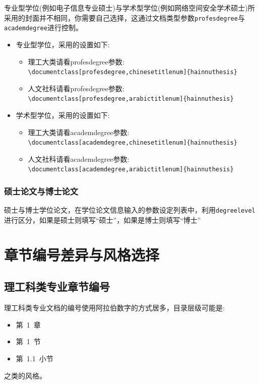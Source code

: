 专业型学位(例如电子信息专业硕士)与学术型学位(例如网络空间安全学术硕士)所采用的封面并不相同，你需要自己选择，这通过文档类型参数\verb|profesdegree|与\verb|academdegree|进行控制。
\begin{itemize}
\item 专业型学位，采用的设置如下:
	\begin{itemize}
	\item 理工大类请看profesdegree参数:\\
	  \verb|\documentclass[profesdegree,chinesetitlenum]{hainnuthesis}|
	\item 人文社科请看profesdegree参数:\\
	 \verb|\documentclass[profesdegree,arabictitlenum]{hainnuthesis}|
	\end{itemize} 
\item 学术型学位，采用的设置如下:
	\begin{itemize}
	\item 理工大类请看academdegree参数:\\
	 \verb|\documentclass[academdegree,chinesetitlenum]{hainnuthesis}|
	\item 人文社科请看academdegree参数:\\
	 \verb|\documentclass[academdegree,arabictitlenum]{hainnuthesis}|
	\end{itemize} 
\end{itemize}

\subsubsection{硕士论文与博士论文}
硕士与博士学位论文，在学位论文信息输入的参数设定列表中，利用\verb|degreelevel|
进行区分，如果是硕士则填写“硕士”，如果是博士则填写“博士” 


\section{章节编号差异与风格选择}

\subsection{理工科类专业章节编号}

理工科类专业文档的编号使用阿拉伯数字的方式居多，目录层级可能是: 
\begin{itemize}
\item 第~1~章
\item \quad 第~1~节
\item \qquad 第~1.1~小节
\end{itemize}
之类的风格。



